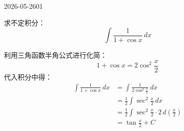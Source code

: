 \begin{mistake}{2026-05-26}{01}

\begin{problemcontent}
求不定积分：
\[
\int \frac{1}{1+\cos x} \, dx
\]
\end{problemcontent}

\begin{solutioncontent}
利用三角函数半角公式进行化简：
\[
1 + \cos x = 2\cos^2 \frac{x}{2}
\]
代入积分中得：
\[
\begin{aligned}
\int \frac{1}{1 + \cos x} \, dx 
&= \int \frac{1}{2\cos^2 \frac{x}{2}} \, dx \\
&= \frac{1}{2} \int \sec^2 \frac{x}{2} \, dx \\
&= \frac{1}{2} \int \sec^2 \frac{x}{2} \cdot 2 \, d\left(\frac{x}{2}\right) \\
&= \tan \frac{x}{2} + C
\end{aligned}
\]
\end{solutioncontent}


\end{mistake}
